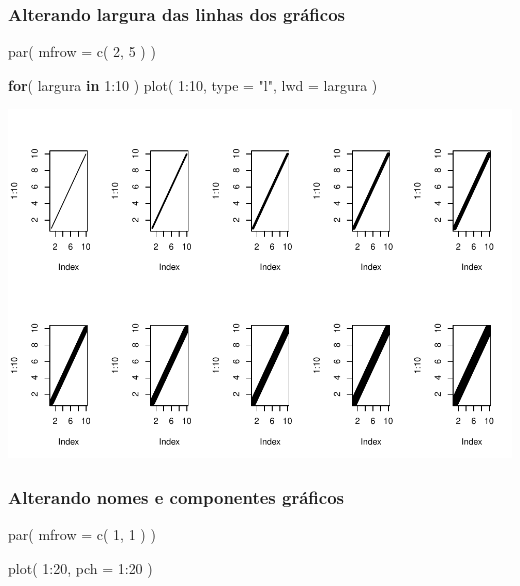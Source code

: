 \documentclass[
]{article}
\newenvironment{Shaded}{\begin{snugshade}}{\end{snugshade}}
\newcommand{\AttributeTok}[1]{\textcolor[rgb]{0.77,0.63,0.00}{#1}}
\newcommand{\ControlFlowTok}[1]{\textcolor[rgb]{0.13,0.29,0.53}{\textbf{#1}}}
\newcommand{\DecValTok}[1]{\textcolor[rgb]{0.00,0.00,0.81}{#1}}
\newcommand{\FunctionTok}[1]{\textcolor[rgb]{0.00,0.00,0.00}{#1}}
\newcommand{\NormalTok}[1]{#1}
\newcommand{\SpecialCharTok}[1]{\textcolor[rgb]{0.00,0.00,0.00}{#1}}
\newcommand{\StringTok}[1]{\textcolor[rgb]{0.31,0.60,0.02}{#1}}
\begin{document}
\hypertarget{alterando-largura-das-linhas-dos-gruxe1ficos}{%
\subsubsection{Alterando largura das linhas dos
gráficos}\label{alterando-largura-das-linhas-dos-gruxe1ficos}}

\begin{Shaded}
\begin{Highlighting}[]
\FunctionTok{par}\NormalTok{( }\AttributeTok{mfrow =} \FunctionTok{c}\NormalTok{( }\DecValTok{2}\NormalTok{, }\DecValTok{5}\NormalTok{ ) )}

\ControlFlowTok{for}\NormalTok{( largura }\ControlFlowTok{in} \DecValTok{1}\SpecialCharTok{:}\DecValTok{10}\NormalTok{ ) }\FunctionTok{plot}\NormalTok{( }\DecValTok{1}\SpecialCharTok{:}\DecValTok{10}\NormalTok{, }\AttributeTok{type =} \StringTok{"l"}\NormalTok{, }\AttributeTok{lwd =}\NormalTok{ largura )}
\end{Highlighting}
\end{Shaded}

\includegraphics{presencial_função_plot_04_turma_B_files/figure-latex/unnamed-chunk-11-1.pdf}

\hypertarget{alterando-nomes-e-componentes-gruxe1ficos}{%
\subsubsection{Alterando nomes e componentes
gráficos}\label{alterando-nomes-e-componentes-gruxe1ficos}}

\begin{Shaded}
\begin{Highlighting}[]
\FunctionTok{par}\NormalTok{( }\AttributeTok{mfrow =} \FunctionTok{c}\NormalTok{( }\DecValTok{1}\NormalTok{, }\DecValTok{1}\NormalTok{ ) )}

\FunctionTok{plot}\NormalTok{( }\DecValTok{1}\SpecialCharTok{:}\DecValTok{20}\NormalTok{, }\AttributeTok{pch =} \DecValTok{1}\SpecialCharTok{:}\DecValTok{20}\NormalTok{ )}
\end{Highlighting}
\end{Shaded}
\end{document}
